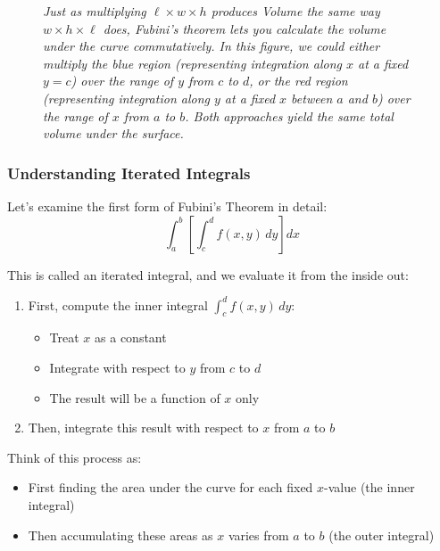 \begin{figure}[H]
\caption{\textit{Just as multiplying $\ell \times w \times h$ produces Volume the same way $w \times h \times \ell$ does, Fubini's theorem lets you calculate the volume under the curve commutatively. In this figure, we could either multiply the blue region (representing integration along $x$ at a fixed $y=c$) over the range of $y$ from $c$ to $d$, or the red region (representing integration along $y$ at a fixed $x$ between $a$ and $b$) over the range of $x$ from $a$ to $b$. Both approaches yield the same total volume under the surface.}}
\end{figure}

\subsubsection*{Understanding Iterated Integrals} 

\noindent Let's examine the first form of Fubini's Theorem in detail:
\[
\int_a^b \left[\int_c^d f(x,y) \, dy\right] dx
\]

\noindent This is called an iterated integral, and we evaluate it from the inside out:

\begin{enumerate}
   \item First, compute the inner integral $\displaystyle\int_c^d f(x,y) \, dy$:
       \begin{itemize}
           \item Treat $x$ as a constant
           \item Integrate with respect to $y$ from $c$ to $d$
           \item The result will be a function of $x$ only
       \end{itemize}
   \item Then, integrate this result with respect to $x$ from $a$ to $b$
\end{enumerate}

\noindent Think of this process as:
\begin{itemize}
   \item First finding the area under the curve for each fixed $x$-value (the inner integral)
   \item Then accumulating these areas as $x$ varies from $a$ to $b$ (the outer integral)
\end{itemize}


